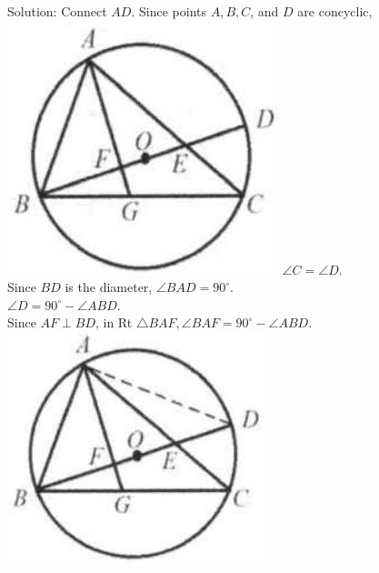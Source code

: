 \documentclass[10pt]{article}
\begin{document}
Solution:
Connect \(A D\). Since points \(A, B, C\), and \(D\) are concyclic,\\
\includegraphics[max width=\textwidth]{2025_04_17_97bc1f7e44d93c271a88g-165(4)} \(\angle C=\angle D\).\\
Since \(B D\) is the diameter, \(\angle B A D=90^{\circ}\).\\
\(\angle D=90^{\circ}-\angle A B D\).\\
Since \(A F \perp B D\), in Rt \(\triangle B A F, \angle B A F=90^{\circ}-\angle A B D\).\\
\includegraphics[max width=\textwidth, center]{2025_04_17_97bc1f7e44d93c271a88g-165(2)}
\end{document}
